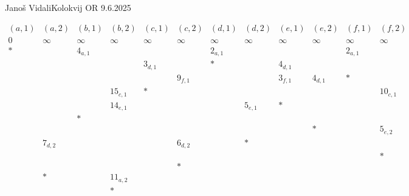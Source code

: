 \begin{naloga}{Janoš Vidali}{Kolokvij OR 9.6.2025}
\begin{odgovor}
\begin{tabela}[htbp]
$$
\begin{array}{cccccccccccc}
(a, 1) & (a, 2) & (b, 1) & (b, 2) & (c, 1) & (c, 2) & (d, 1) & (d, 2) & (e, 1) & (e, 2) & (f, 1) & (f, 2) \\ \hline
0 & \infty & \infty & \infty & \infty & \infty & \infty & \infty & \infty & \infty & \infty & \infty \\
* && 4_{a,1} &&&& 2_{a,1} &&&& 2_{a,1} & \\
&&&& 3_{d,1} && * && 4_{d,1} &&& \\
&&&&& 9_{f,1} &&& 3_{f,1} & 4_{d,1} & * & \\
&&& 15_{c,1} & * &&&&&&& 10_{c,1} \\
&&& 14_{e,1} &&&& 5_{e,1} & * &&& \\
&& * &&&&&&&&& \\
&&&&&&&&& * && 5_{e,2} \\
& 7_{d,2} &&&& 6_{d,2} && * &&&& \\
&&&&&&&&&&& * \\
&&&&& * &&&&&& \\
& * && 11_{a,2} &&&&&&&& \\
&&& * &&&&&&&&
\end{array}
$$
\end{tabela}
\end{odgovor}
\end{naloga}
